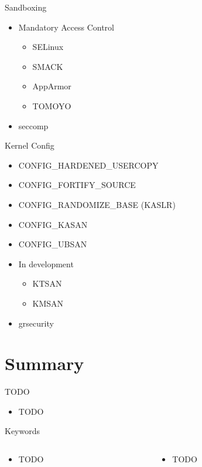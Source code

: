 \documentclass{curs}
\begin{document}
\begin{frame}{Sandboxing}
  \begin{itemize}
    \item Mandatory Access Control
      \begin{itemize}
        \item SELinux
        \item SMACK
        \item AppArmor
        \item TOMOYO
      \end{itemize}
    \item seccomp
  \end{itemize}
\end{frame}

\begin{frame}{Kernel Config}
  \begin{itemize}
    \item CONFIG_HARDENED_USERCOPY
    \item CONFIG_FORTIFY_SOURCE
    \item CONFIG_RANDOMIZE_BASE (KASLR)
    \item CONFIG_KASAN
    \item CONFIG_UBSAN
    \item In development
      \begin{itemize}
        \item KTSAN
        \item KMSAN
      \end{itemize}
    \item grsecurity
  \end{itemize}
\end{frame}


\section{Summary}

\begin{frame}{TODO}
  \begin{itemize}
    \item TODO
  \end{itemize}
\end{frame}

\begin{frame}{Keywords}
  \begin{columns}
    \begin{column}{0.5\textwidth}
      \begin{itemize}
        \item TODO
      \end{itemize}
    \end{column}
    \begin{column}{0.5\textwidth}
      \begin{itemize}
        \item TODO
      \end{itemize}
    \end{column}
  \end{columns}
\end{frame}
\end{document}
